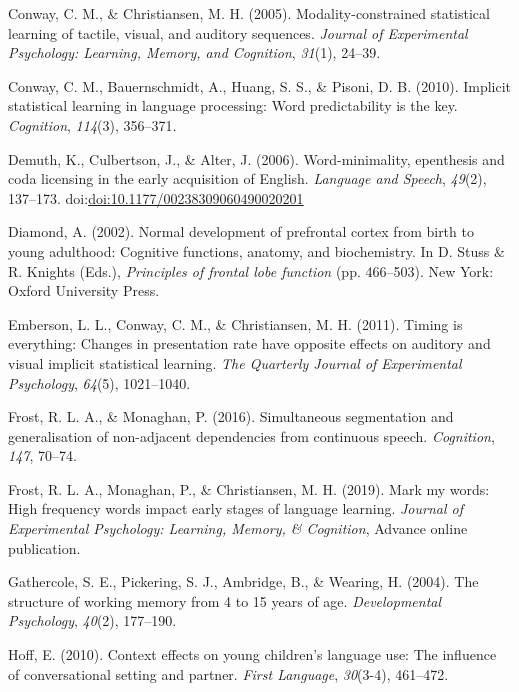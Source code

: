 \documentclass[man,mask,floatsintext]{apa6}
\begin{document}
\hypertarget{ref-conway2005modality}{}
Conway, C. M., \& Christiansen, M. H. (2005). Modality-constrained
statistical learning of tactile, visual, and auditory sequences.
\emph{Journal of Experimental Psychology: Learning, Memory, and
Cognition}, \emph{31}(1), 24--39.

\hypertarget{ref-conway2010implicit}{}
Conway, C. M., Bauernschmidt, A., Huang, S. S., \& Pisoni, D. B. (2010).
Implicit statistical learning in language processing: Word
predictability is the key. \emph{Cognition}, \emph{114}(3), 356--371.

\hypertarget{ref-demuth2006word}{}
Demuth, K., Culbertson, J., \& Alter, J. (2006). Word-minimality,
epenthesis and coda licensing in the early acquisition of English.
\emph{Language and Speech}, \emph{49}(2), 137--173.
doi:\href{https://doi.org/doi:10.1177/00238309060490020201}{doi:10.1177/00238309060490020201}

\hypertarget{ref-diamond2002normal}{}
Diamond, A. (2002). Normal development of prefrontal cortex from birth
to young adulthood: Cognitive functions, anatomy, and biochemistry. In
D. Stuss \& R. Knights (Eds.), \emph{Principles of frontal lobe
function} (pp. 466--503). New York: Oxford University Press.

\hypertarget{ref-emberson2011timing}{}
Emberson, L. L., Conway, C. M., \& Christiansen, M. H. (2011). Timing is
everything: Changes in presentation rate have opposite effects on
auditory and visual implicit statistical learning. \emph{The Quarterly
Journal of Experimental Psychology}, \emph{64}(5), 1021--1040.

\hypertarget{ref-frost2016simultaneous}{}
Frost, R. L. A., \& Monaghan, P. (2016). Simultaneous segmentation and
generalisation of non-adjacent dependencies from continuous speech.
\emph{Cognition}, \emph{147}, 70--74.

\hypertarget{ref-frost2019}{}
Frost, R. L. A., Monaghan, P., \& Christiansen, M. H. (2019). Mark my
words: High frequency words impact early stages of language learning.
\emph{Journal of Experimental Psychology: Learning, Memory, \&
Cognition}, Advance online publication.

\hypertarget{ref-gathercole2004structure}{}
Gathercole, S. E., Pickering, S. J., Ambridge, B., \& Wearing, H.
(2004). The structure of working memory from 4 to 15 years of age.
\emph{Developmental Psychology}, \emph{40}(2), 177--190.

\hypertarget{ref-hoff2010context}{}
Hoff, E. (2010). Context effects on young children's language use: The
influence of conversational setting and partner. \emph{First Language},
\emph{30}(3-4), 461--472.
\end{document}
